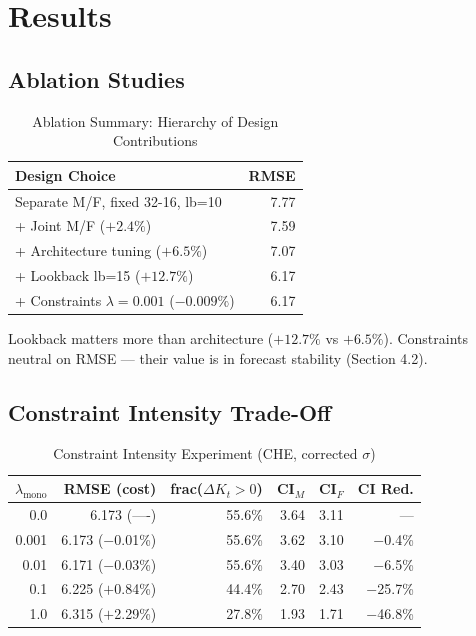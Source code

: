 \documentclass[11pt,a4paper]{article}
\begin{document}
\section{Results}

\subsection{Ablation Studies}

\begin{table}[H]
\centering
\caption{Ablation Summary: Hierarchy of Design Contributions}
\label{tab:ablation}
\begin{tabular}{@{}lr@{}}
\toprule
Design Choice & RMSE \\ \midrule
Separate M/F, fixed 32-16, lb=10 & 7.77 \\
+ Joint M/F ($+2.4\%$) & 7.59 \\
+ Architecture tuning ($+6.5\%$) & 7.07 \\
+ Lookback lb=15 ($+12.7\%$) & 6.17 \\
+ Constraints $\lambda = 0.001$ ($-0.009\%$) & 6.17 \\
\bottomrule
\end{tabular}
\end{table}

Lookback matters more than architecture ($+12.7\%$ vs $+6.5\%$). Constraints neutral on RMSE --- their value is in forecast stability (Section 4.2).

\subsection{Constraint Intensity Trade-Off}

\begin{table}[H]
\centering
\caption{Constraint Intensity Experiment (CHE, corrected $\sigma$)}
\label{tab:constraint}
\begin{tabular}{@{}rrrrrr@{}}
\toprule
$\lambda_{\text{mono}}$ & RMSE (cost) & frac($\Delta K_t > 0$) & CI$_M$ & CI$_F$ & CI Red. \\ \midrule
0.0    & 6.173 (----)  & 55.6\% & 3.64 & 3.11 & ---    \\
0.001  & 6.173 ($-$0.01\%) & 55.6\% & 3.62 & 3.10 & $-$0.4\%  \\
0.01   & 6.171 ($-$0.03\%) & 55.6\% & 3.40 & 3.03 & $-$6.5\%  \\
0.1    & 6.225 ($+$0.84\%) & 44.4\% & 2.70 & 2.43 & $-$25.7\% \\
1.0    & 6.315 ($+$2.29\%) & 27.8\% & 1.93 & 1.71 & $-$46.8\% \\ \bottomrule
\end{tabular}
\end{table}
\end{document}
